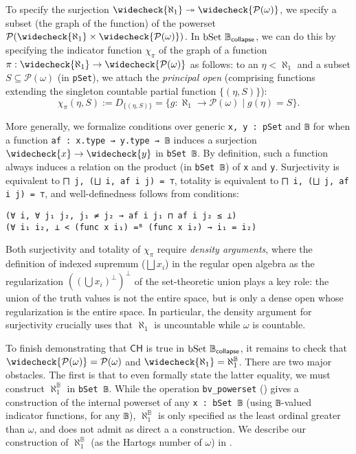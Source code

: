 \documentclass[sigplan,10pt,review, anonymous]{acmart}
\newcommand{\lil}{\lstinline}
\newcommand{\CH}{\mathsf{CH}}
\theoremstyle{definition}
\begin{document}
To specify the surjection \(\widecheck{\aleph_1} \twoheadrightarrow \widecheck{\mathcal{P}(\omega)}\), we specify a subset (the graph of the function) of the powerset \(\mathcal{P}(\widecheck{\aleph_1} \times \widecheck{\mathcal{P}(\omega)})\).
In \(\text{\lil{bSet}}\ \mathbb{B}_{\mathsf{collapse}}\), we can do this by specifying the indicator function \(\chi_{\pi}\) of the graph of a function \(\pi : \widecheck{\aleph_1} \to \widecheck{\mathcal{P}(\omega)}\) as follows: to an \(\eta < \aleph_1\) and a subset \(S \subseteq \mathcal{P}(\omega)\) (in \lil{pSet}), we attach the \emph{principal open} (comprising functions extending the singleton countable partial function \(\{(\eta, S)\}\)):
\[
  \chi_\pi (\eta, S) := D_{\{(\eta, S)\}} = \{g : \aleph_1 \to \mathcal{P}(\omega) \operatorname{|} g (\eta) = S\}.
\]

More generally, we formalize conditions over generic \lil{x, y : pSet} and \lil{𝔹} for when a function \lil{af : x.type → y.type → 𝔹} induces a surjection \(\widecheck{x} \to \widecheck{y}\) in \lil{bSet 𝔹}.
By definition, such a function always induces a relation on the product (in \lil{bSet 𝔹}) of \lil{x} and \lil{y}.
Surjectivity is equivalent to \lil{⨅ j, (⨆ i, af i j) = ⊤}, totality is equivalent to \lil{⨅ i, (⨆ j, af i j) = ⊤}, and well-definedness follows from conditions:
\begin{lstlisting}
(∀ i, ∀ j₁ j₂, j₁ ≠ j₂ → af i j₁ ⊓ af i j₂ ≤ ⊥)
(∀ i₁ i₂, ⊥ < (func x i₁) =ᴮ (func x i₂) → i₁ = i₂)
\end{lstlisting}
Both surjectivity and totality of \(\chi_{\pi}\) require \emph{density arguments}, where the definition of indexed supremum (\(\bigsqcup x_i\)) in the regular open algebra as the regularization \(((\bigcup x_i)^\perp)^\perp\) of the set-theoretic union plays a key role: the union of the truth values is not the entire space, but is only a dense open whose regularization is the entire space. In particular, the density argument for surjectivity crucially uses that \(\aleph_1\) is uncountable while \(\omega\) is countable.

To finish demonstrating that \(\CH\) is true in \(\text{\lil{bSet}}\ \mathbb{B}_{\mathsf{collapse}}\), it remains to check that \(\widecheck{\mathcal{P}(\omega)} = \mathcal{P}(\omega)\) and \(\widecheck{\aleph_1} = \aleph_1^{\mathbb{B}}\).
There are two major obstacles. The first is that to even formally state the latter equality, we must construct \(\aleph_1^{\mathbb{B}}\) in \lil{bSet 𝔹}.
While the operation \lil{bv_powerset} () gives a construction of the internal powerset of any \lil{x : bSet 𝔹} (using \lil{𝔹}-valued indicator functions, for any \lil{𝔹}), \(\aleph_1^{\mathbb{B}}\) is only specified as the least ordinal greater than \(\omega\), and does not admit as direct a a construction.
We describe our construction of \(\aleph_1^{\mathbb{B}}\) (as the Hartogs number of \(\omega\)) in .
\end{document}
